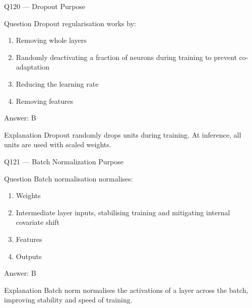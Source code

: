 \documentclass[aspectratio=169,8pt]{beamer}
\begin{document}
	\begin{frame}{Q120 --- Dropout Purpose}
		\begin{block}{Question}
			Dropout regularisation works by:
			\begin{enumerate}
				\item Removing whole layers
				\item Randomly deactivating a fraction of neurons during training to prevent co-adaptation
				\item Reducing the learning rate
				\item Removing features
			\end{enumerate}
		\end{block}
		\begin{exampleblock}{Answer: B}\end{exampleblock}
		\begin{block}{Explanation}
			Dropout randomly drops units during training. At inference, all units are used with scaled weights.
		\end{block}
	\end{frame}
	
	\begin{frame}{Q121 --- Batch Normalization Purpose}
		\begin{block}{Question}
			Batch normalisation normalises:
			\begin{enumerate}
				\item Weights
				\item Intermediate layer inputs, stabilising training and mitigating internal covariate shift
				\item Features
				\item Outputs
			\end{enumerate}
		\end{block}
		\begin{exampleblock}{Answer: B}\end{exampleblock}
		\begin{block}{Explanation}
			Batch norm normalises the activations of a layer across the batch, improving stability and speed of training.
		\end{block}
	\end{frame}
	
\end{document}
